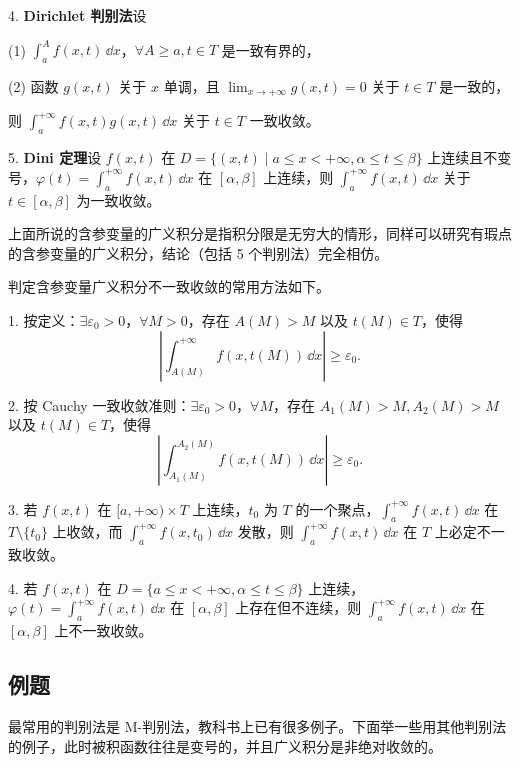 4. \textbf{Dirichlet 判别法}\quad 设

(1) $\displaystyle\int_a^A f(x,t)\,\dd x$，$\forall A\geqslant a,t\in T$ 是一致有界的，

(2) 函数 $g(x,t)$ 关于 $x$ 单调，且 $\displaystyle\lim_{x\to+\infty}g(x,t)=0$ 关于 $t\in T$ 是一致的，

则 $\displaystyle\int_a^{+\infty}f(x,t)g(x,t)\,\dd x$ 关于 $t\in T$ 一致收敛。

5. \textbf{Dini 定理}\quad 设 $f(x,t)$ 在 $D=\{(x,t)\mid a\leqslant x<+\infty,\alpha\leqslant t\leqslant\beta\}$ 上连续且不变号，$\varphi(t)=\displaystyle\int_a^{+\infty}f(x,t)\,\dd x$ 在 $[\alpha,\beta]$ 上连续，则 $\displaystyle\int_a^{+\infty}f(x,t)\,\dd x$ 关于 $t\in[\alpha,\beta]$ 为一致收敛。

上面所说的含参变量的广义积分是指积分限是无穷大的情形，同样可以研究有瑕点的含参变量的广义积分，结论（包括 5 个判别法）完全相仿。

判定含参变量广义积分不一致收敛的常用方法如下。

1. 按定义：$\exists\varepsilon_0>0$，$\forall M>0$，存在 $A(M)>M$ 以及 $t(M)\in T$，使得
\[
  \left|\int_{A(M)}^{+\infty}f(x,t(M))\,\dd x\right|\geqslant\varepsilon_0.
\]

2. 按 Cauchy 一致收敛准则：$\exists\varepsilon_0>0$，$\forall M$，存在 $A_1(M)>M,A_2(M)>M$ 以及 $t(M)\in T$，使得
\[
  \left|\int_{A_1(M)}^{A_2(M)}f(x,t(M))\,\dd x\right|\geqslant\varepsilon_0.
\]

3. 若 $f(x,t)$ 在 $[a,+\infty)\times T$ 上连续，$t_0$ 为 $T$ 的一个聚点，$\displaystyle\int_a^{+\infty}f(x,t)\,\dd x$ 在 $T\setminus\{t_0\}$ 上收敛，而 $\displaystyle\int_a^{+\infty}f(x,t_0)\,\dd x$ 发散，则 $\displaystyle\int_a^{+\infty}f(x,t)\,\dd x$ 在 $T$ 上必定不一致收敛。

4. 若 $f(x,t)$ 在 $D=\{a\leqslant x<+\infty,\alpha\leqslant t\leqslant\beta\}$ 上连续，$\varphi(t)=\displaystyle\int_a^{+\infty}f(x,t)\,\dd x$ 在 $[\alpha,\beta]$ 上存在但不连续，则 $\displaystyle\int_a^{+\infty}f(x,t)\,\dd x$ 在 $[\alpha,\beta]$ 上不一致收敛。

\subsection{例题}

最常用的判别法是 M-判别法，教科书上已有很多例子。下面举一些用其他判别法的例子，此时被积函数往往是变号的，并且广义积分是非绝对收敛的。

